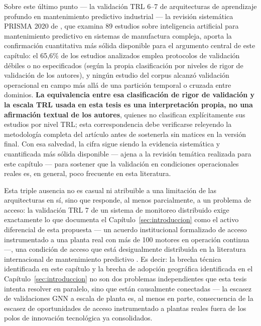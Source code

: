 \documentclass[11pt]{article}
\begin{document}
Sobre este último punto --- la validación TRL 6--7 de arquitecturas de aprendizaje profundo en mantenimiento predictivo industrial --- la revisión sistemática PRISMA 2020 de \citet{henaovilla2026}, que examina 89 estudios sobre inteligencia artificial para mantenimiento predictivo en sistemas de manufactura compleja, aporta la confirmación cuantitativa más sólida disponible para el argumento central de este capítulo: el 65,6\% de los estudios analizados emplea protocolos de validación débiles o no especificados (según la propia clasificación por niveles de rigor de validación de los autores), y ningún estudio del corpus alcanzó validación operacional en campo más allá de una partición temporal o cruzada entre dominios. \textbf{La equivalencia entre esa clasificación de rigor de validación y la escala TRL usada en esta tesis es una interpretación propia, no una afirmación textual de los autores}, quienes no clasifican explícitamente sus estudios por nivel TRL; esta correspondencia debe verificarse releyendo la metodología completa del artículo antes de sostenerla sin matices en la versión final. Con esa salvedad, la cifra sigue siendo la evidencia sistemática y cuantificada más sólida disponible --- ajena a la revisión temática realizada para este capítulo --- para sostener que la validación en condiciones operacionales reales es, en general, poco frecuente en esta literatura.

Esta triple ausencia no es casual ni atribuible a una limitación de las arquitecturas en sí, sino que responde, al menos parcialmente, a un problema de acceso: la validación TRL 7 de un sistema de monitoreo distribuido exige exactamente lo que documenta el Capítulo~\ref{sec:introduccion} como el activo diferencial de esta propuesta --- un acuerdo institucional formalizado de acceso instrumentado a una planta real con más de 100 motores en operación continua ---, una condición de acceso que está desigualmente distribuida en la literatura internacional de mantenimiento predictivo \citep{peter2023}. Es decir: la brecha técnica identificada en este capítulo y la brecha de adopción geográfica identificada en el Capítulo~\ref{sec:introduccion} no son dos problemas independientes que esta tesis intenta resolver en paralelo, sino que están causalmente conectadas --- la escasez de validaciones GNN a escala de planta es, al menos en parte, consecuencia de la escasez de oportunidades de acceso instrumentado a plantas reales fuera de los polos de innovación tecnológica ya consolidados.
\end{document}
